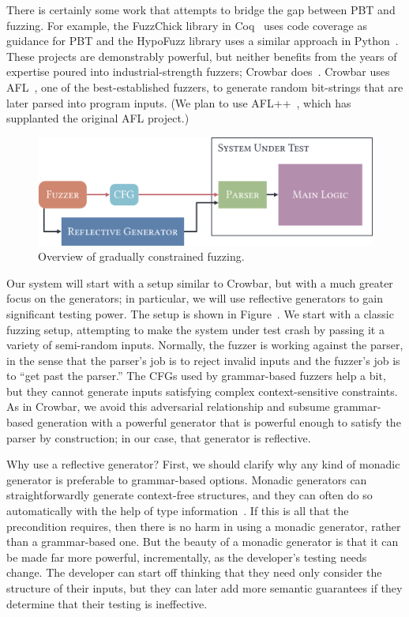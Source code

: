 There is certainly some work that attempts to bridge the gap between PBT and
fuzzing. For example, the FuzzChick library in Coq~\cite{OLDlampropoulos19fuzzchick}
uses code coverage as guidance for PBT and the HypoFuzz library uses a
similar approach in Python~\cite{hatfield-dodds_hypofuzz_nodate}. These projects
are demonstrably powerful, but neither benefits from the years of expertise
poured into industrial-strength fuzzers; Crowbar
does~\cite{dolan2017testing}. Crowbar uses
AFL~\cite{afl-readme}, one of the best-established
fuzzers, to generate random bit-strings that are later parsed into program
inputs.  (We plan to use AFL++~\cite{fioraldi_afl_2020},
which has supplanted the original AFL project.)

\begin{figure}
  \centering
  \includegraphics[width=.4\textwidth]{assets/fuzzing.pdf}
  \caption{Overview of gradually constrained fuzzing.}\label{fig:fuzzing-plan}
\end{figure}

Our system will start with a setup similar to Crowbar, but with a much greater
focus on the generators; in particular, we will use reflective generators to
gain significant testing power. The setup is shown in
Figure~. We start with a classic fuzzing setup, attempting
to make the system under test crash by passing it a variety of semi-random
inputs. Normally, the fuzzer is working against the parser, in the sense that
the parser's job is to reject invalid inputs and the fuzzer's job is to ``get
past the parser.'' The CFGs used by grammar-based fuzzers help a bit, but they
cannot generate inputs satisfying complex context-sensitive constraints. As in
Crowbar, we avoid this adversarial relationship and subsume grammar-based
generation with a powerful generator that is powerful enough to satisfy the
parser by construction; in our case, that generator is reflective.

Why use a reflective generator? First, we should clarify why any kind of monadic
generator is preferable to grammar-based options. Monadic generators can
straightforwardly generate context-free structures, and they can often do so
automatically with the help of type information~\cite{mista2019deriving}. If
this is all that the precondition requires, then there is no harm in using a
monadic generator, rather than a grammar-based one. But the beauty of a monadic
generator is that it can be made far more powerful, incrementally, as the
developer's testing needs change. The developer can start off thinking that they
need only consider the structure of their inputs, but they can later add more
semantic guarantees if they determine that their testing is ineffective.


